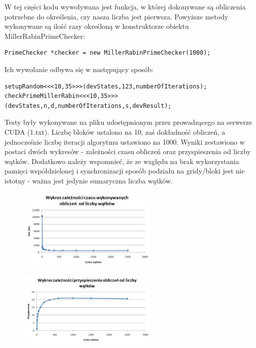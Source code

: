 \documentclass[a4paper,12pt]{article}
\begin{document}
W tej części kodu wywoływana jest funkcja, w której dokonywane są obliczenia potrzebne do określenia, czy nasza liczba jest pierwsza. Powyższe metody wykonywane są ilość razy określoną w konstruktorze obiektu MillerRabinPrimeChecker:

\begin{lstlisting}
PrimeChecker *checker = new MillerRabinPrimeChecker(1000);
\end{lstlisting}

Ich wywołanie odbywa się w następujący sposób:

\begin{lstlisting}
setupRandom<<<10,35>>>(devStates,123,numberOfIterations);
checkPrimeMillerRabin<<<10,35>>>(devStates,n,d,numberOfIterations,s,devResult);
\end{lstlisting}

Testy były wykonywane na pliku udostępnionym przez prowadzącego na serwerze CUDA (1.txt). Liczbę bloków ustalono na 10, zaś dokładność obliczeń, a jednocześnie liczbę iteracji algorytmu ustawiono na 1000. Wyniki zestawiono w postaci dwóch wykresów - zależności czasu obliczeń oraz przyspieszenia od liczby wątków. Dodatkowo należy wspomnieć, że ze względu na brak wykorzystania pamięci współdzielonej i synchronizacji sposób podziału na gridy/bloki jest nie istotny - ważna jest jedynie sumaryczna liczba wątków.

\begin{figure}[!h]
	\centering
  \includegraphics[width=0.6\textwidth]{1.jpg}
\end{figure}

\begin{figure}[!h]
	\centering
  \includegraphics[width=0.6\textwidth]{2.jpg}
\end{figure}
\end{document}
